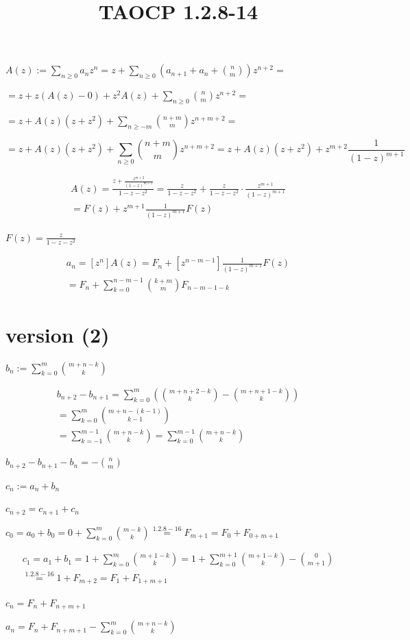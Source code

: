\documentclass{article}
\title{TAOCP 1.2.8\mbox{-}14}
\begin{document}
\maketitle

\( A(z) := \sum_{n \geq 0}a_{n}z^{n} = z + \sum_{n \geq 0}(a_{n+1} + a_{n} + \binom{n}{m})z^{n+2} = \)

\( = z + z(A(z) - 0) + z^{2} A(z) + \sum_{n \geq 0}\binom{n}{m} z^{n+2} = \)

\( = z + A(z)(z+z^{2}) + \sum_{n \geq -m}\binom{n+m}{m} z^{n+m+2} = \)

\[ = z + A(z)(z+z^{2}) + \sum_{n \geq 0}\binom{n+m}{m} z^{n+m+2} = z+A(z)(z+z^{2})+z^{m+2}\frac{1}{{(1-z)}^{m+1}} \]

\begin{multline*}
A(z) = \frac{z + \frac{z^{m+2}}{{(1-z)}^{m+1}}}{1-z-z^{2}} = \frac{z}{1-z-z^{2}} + \frac{z}{1-z-z^{2}} \cdot \frac{z^{m+1}}{{(1-z)}^{m+1}} \\
= F(z) + z^{m+1} \frac{1}{{(1-z)}^{m+1}} F(z)
\end{multline*}

\( F(z) = \frac{z}{1-z-z^{2}} \)

\begin{multline*}
a_{n} = [z^{n}]A(z) = F_{n} + [z^{n-m-1}] \frac{1}{{(1-z)}^{m+1}}F(z) \\
= F_{n} + \sum_{k=0}^{n-m-1} \binom{k+m}{m}F_{n-m-1-k}
\end{multline*}

\section*{version (2)}

\( b_{n} := \sum_{k=0}^{m} \binom{m+n-k}{k} \)

\begin{multline*}
b_{n+2} - b_{n+1} = \sum_{k=0}^{m} (\binom{m+n+2-k}{k} - \binom{m+n+1-k}{k}) \\
= \sum_{k=0}^{m} \binom{m+n-(k-1)}{k-1} \\
= \sum_{k=-1}^{m-1}\binom{m+n-k}{k} = \sum_{k=0}^{m-1}\binom{m+n-k}{k}
\end{multline*}

\( b_{n+2} - b_{n+1} - b_{n} = -\binom{n}{m} \)

\( c_{n} := a_{n} + b_{n} \)

\( c_{n+2} = c_{n+1} + c_{n} \)

\( c_{0} = a_{0} + b_{0} = 0 + \sum_{k=0}^{m}\binom{m-k}{k} \overset{1.2.8-16}{=} F_{m+1} = F_{0} + F_{0+m+1} \)

\begin{multline*}
c_{1} = a_{1} + b_{1} = 1 + \sum_{k=0}^{m}\binom{m+1-k}{k} = 1 + \sum_{k=0}^{m+1}\binom{m+1-k}{k} - \binom{0}{m+1} \\
\overset{1.2.8-16}{=} 1 + F_{m+2} = F_{1} + F_{1 + m + 1}
\end{multline*}

\( c_{n} = F_{n} + F_{n+m+1} \)

\( a_{n} = F_{n} + F_{n+m+1} - \sum_{k=0}^{m} \binom{m+n-k}{k} \)
\end{document}
